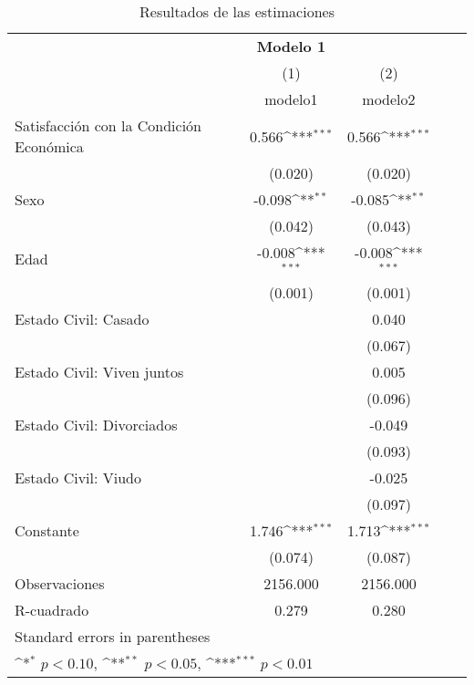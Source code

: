 \begin{table}[htbp]\centering
\def\sym#1{\ifmmode^{#1}\else\(^{#1}\)\fi}
\caption{Resultados de las estimaciones}
\begin{tabular}{l*{2}{ c c }}
\hline\hline
            &\textbf{Modelo 1}                          \\
            &\multicolumn{1}{c}{(1)}&\multicolumn{1}{c}{(2)}\\
            &\multicolumn{1}{c}{modelo1}&\multicolumn{1}{c}{modelo2}\\
\hline
Satisfacción con la Condición Económica&       0.566\sym{***}&       0.566\sym{***}\\
            &     (0.020)         &     (0.020)         \\
Sexo        &      -0.098\sym{**} &      -0.085\sym{**} \\
            &     (0.042)         &     (0.043)         \\
Edad        &      -0.008\sym{***}&      -0.008\sym{***}\\
            &     (0.001)         &     (0.001)         \\
Estado Civil: Casado&                     &       0.040         \\
            &                     &     (0.067)         \\
Estado Civil: Viven juntos&                     &       0.005         \\
            &                     &     (0.096)         \\
Estado Civil: Divorciados&                     &      -0.049         \\
            &                     &     (0.093)         \\
Estado Civil: Viudo&                     &      -0.025         \\
            &                     &     (0.097)         \\
Constante   &       1.746\sym{***}&       1.713\sym{***}\\
            &     (0.074)         &     (0.087)         \\
\hline
Observaciones&    2156.000         &    2156.000         \\
R-cuadrado  &       0.279         &       0.280         \\
\hline\hline
\multicolumn{3}{l}{\footnotesize Standard errors in parentheses}\\
\multicolumn{3}{l}{\footnotesize \sym{*} \(p<0.10\), \sym{**} \(p<0.05\), \sym{***} \(p<0.01\)}\\
\end{tabular}
\end{table}
